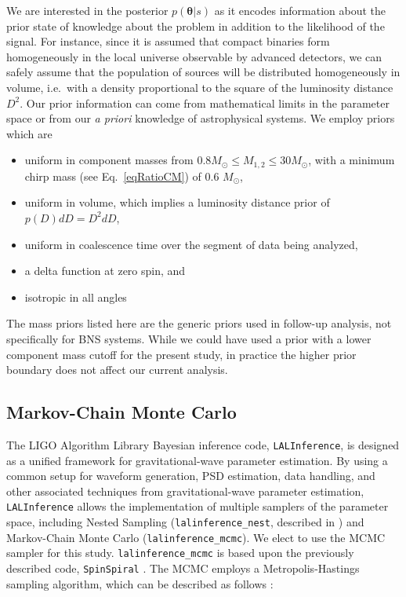 \documentclass[11pt,a4paper]{emulateapj} 
\newcommand{\thpara}{\boldsymbol{\theta}}
\begin{document}
We are interested in the posterior $p(\thpara | s)$ as it encodes
information about the prior state of knowledge about the problem in
addition to the likelihood of the signal.  For instance, since it is
assumed that compact binaries form homogeneously in the local universe
observable by advanced detectors, we can safely assume that the
population of sources will be distributed homogeneously in volume, i.e.\
with a density proportional to the square of the luminosity distance $D^2$.  
Our prior information can come from mathematical limits in the parameter space 
or from our \textit{a priori} knowledge of astrophysical systems.  
We employ priors which are
\begin{itemize}
\item uniform in component masses from $0.8M_{\odot} \leq M_{1,2} \leq
  30M_{\odot}$, with a minimum chirp mass (see Eq.~\eqref{eqRatioCM})
  of 0.6 $M_{\odot}$,
\item uniform in volume, which implies a luminosity distance prior of
  $p(D)dD = D^2 dD$,
\item uniform in coalescence time over the segment of data being
  analyzed,
  \item a delta function at zero spin, and
\item isotropic in all angles
\end{itemize}
The mass priors listed here are the generic priors used in follow-up
analysis, not specifically for BNS systems.  While we could have used
a prior with a lower component mass cutoff for the present study, in
practice the higher prior boundary does not affect our current
analysis.


  
\subsection{Markov-Chain Monte Carlo}
\label{MCMCSection}
  
The LIGO Algorithm Library Bayesian inference code,
\texttt{LALInference}, is designed as a unified framework for
gravitational-wave parameter estimation.  By using a common setup for
waveform generation, PSD estimation, data handling, and other
associated techniques from gravitational-wave parameter estimation,
\texttt{LALInference} allows the implementation of multiple samplers
of the parameter space, including Nested Sampling
(\texttt{lalinference\_nest}, described in \cite{nestedsampling2010})
and Markov-Chain Monte Carlo (\texttt{lalinference\_mcmc}).  We elect
to use the MCMC sampler for this study.  \texttt{lalinference\_mcmc}
is based upon the previously described code, \texttt{SpinSpiral}
\citep{spinspiral2009, spinspiral2010}.  The MCMC employs a
Metropolis-Hastings sampling algorithm, which can be described as
follows \citep{Gilks99}:
  
\end{document}
